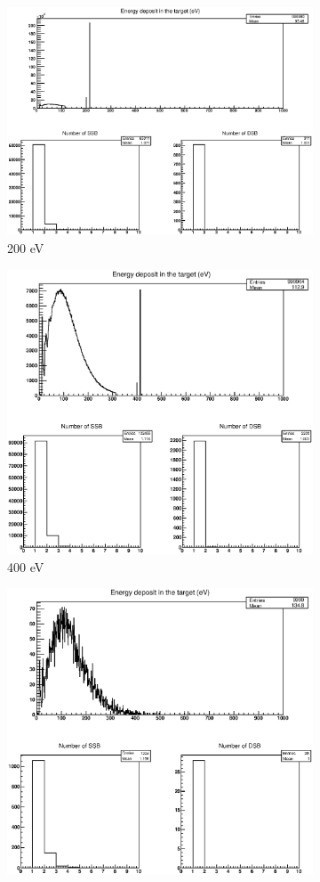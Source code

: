 \begin{figure}
\centering
\begin{subfigure}{.5\textwidth}
  \centering
  \includegraphics[width=.78\linewidth]{./Figures/1zbbp200ev.eps}
  \caption{200 eV}
  \label{fig:sub1}
\end{subfigure}%
\begin{subfigure}{.5\textwidth}
  \centering
  \includegraphics[width=.78\linewidth]{./Figures/1zbbp400ev.eps}
  \caption{400 eV}
  \label{fig:sub2}
\end{subfigure}
\begin{subfigure}{.5\textwidth}
  \centering
  \includegraphics[width=.78\linewidth]{./Figures/1zbbp600ev.eps}

\end{subfigure}
\end{figure}
